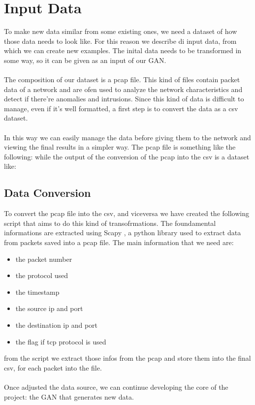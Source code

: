 \chapter{Input Data}
To make new data similar from some existing ones, we need a dataset of how those data needs to look like.
For this reason we describe di input data, from which we can create new examples.
The inital data needs to be transformed in some way, so it can be given as an input of our GAN.
\\\\
The composition of our dataset is a pcap file. This kind of files contain packet data of a network and are
ofen used to analyze the network characteristics and detect if there're anomalies and intrusions.
Since this kind of data is difficult to manage, even if it's well formatted, a first step is to convert the 
data as a csv dataset.
\\\\
In this way we can easily manage the data before giving them to the network and viewing the final results in a
simpler way.
The pcap file is something like the following:
while the output of the conversion of the pcap into the csv is a dataset like:
\section{Data Conversion}
To convert the pcap file into the csv, and viceversa we have created the following script that aims to 
do this kind of transofrmations.
The foundamental informations are extracted using Scapy \cite{scapy}, a python library used to extract data from packets
saved into a pcap file. The main information that we need are:
\begin{itemize}
    \item the packet number
    \item the protocol used 
    \item the timestamp
    \item the source ip and port
    \item the destination ip and port
    \item the flag if tcp protocol is used
\end{itemize}
from the script we extract those infos from the pcap and store them into the final csv, for each packet into 
the file.
\\\\
Once adjusted the data source, we can continue developing the core of the project: the GAN that generates new
data.
